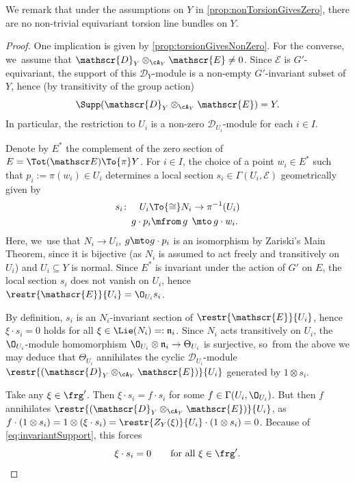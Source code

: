 We remark that under the assumptions on $Y$ in \cref{prop:nonTorsionGivesZero}, there are no non-trivial equivariant torsion line bundles on $Y$.

\begin{proof}
One implication is given by \cref{prop:torsionGivesNonZero}. For the converse, we~assume that $\mathscr{D}_Y \otimes_{\cA_Y} \mathscr{E} \neq 0$. Since $\mathscr{E}$ is $G'$-equivariant, the support of this $\mathscr{D}_Y$\nobreakdash-mod\-ule is a non-empty $G'$-invariant subset of $Y$, hence (by transitivity of the group action)
\begin{equation} \label{eq:invariantSupport}
\Supp(\mathscr{D}_Y \otimes_{\cA_Y} \mathscr{E}) = Y.
\end{equation}
In particular, the restriction to $U_i$ is a non-zero $\mathscr{D}_{U_i}$\nobreakdash-mod\-ule for each $i \in I$.

Denote by $E^*$ the complement of the zero section of $E = \Tot(\mathscr E) \To{\pi} Y$. For $i \in I$, the choice of a point $w_i \in E^*$ such that $p_i := \pi(w_i) \in U_i$ determines a local section $s_i \in \Gamma(U_i, \mathscr E)$ geometrically given by
\begin{align*}
s_i \colon \quad U_i \To{\cong} N_i& \to \pi^{-1}(U_i) \\
g \cdot p_i \mfrom\, g\;\,& \mto \,g \cdot w_i.
\end{align*}
Here, we~use that $N_i \to U_i$, $g \mto g \cdot p_i$ is an isomorphism by Zariski's Main Theorem, since it is bijective (as $N_i$ is assumed to act freely and transitively on $U_i$) and $U_i \subseteq Y$ is normal. Since $E^*$ is invariant under the action of $G'$ on $E$, the local section $s_i$ does not vanish on $U_i$, hence $\restr{\mathscr{E}}{U_i} = \O_{U_i} s_i$.

By definition, $s_i$ is an $N_i$-invariant section of $\restr{\mathscr{E}}{U_i}$, hence $\xi \cdot s_i = 0$ holds for all $\xi \in \Lie(N_i) =: \mathfrak n_i$. Since $N_i$ acts transitively on $U_i$, the $\O_{U_i}$\nobreakdash-mod\-ule homomorphism $\O_{U_i} \otimes \mathfrak n_i \to \Theta_{U_i}$ is surjective, so~from the above we may deduce that $\Theta_{U_i}$ annihilates the cyclic $\mathscr{D}_{U_i}$\nobreakdash-mod\-ule $\restr{(\mathscr{D}_Y \otimes_{\cA_Y} \mathscr{E})}{U_i}$ generated by $1 \otimes s_i$.

Take any $\xi \in \frg'$. Then $\xi \cdot s_i = f \cdot s_i$ for some $f \in \Gamma(U_i,\O_{U_i})$. But then $f$ annihilates $\restr{(\mathscr{D}_Y \otimes_{\cA_Y} \mathscr{E})}{U_i}$, as $f \cdot (1 \otimes s_i) = 1 \otimes (\xi \cdot s_i) = \restr{Z_Y(\xi)}{U_i} \cdot (1 \otimes s_i) = 0$. Because of \eqref{eq:invariantSupport}, this forces
\[
\xi \cdot s_i = 0 \qquad \text{for all }\xi \in \frg'.
\]


\end{proof}
